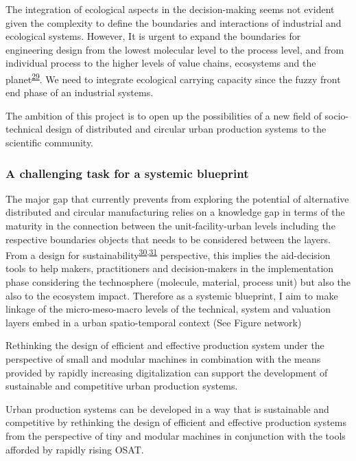 \documentclass[
  11pt,
  a4paperpaper,
  onecolumn]{article}
\begin{document}
The integration of ecological aspects in the decision-making seems not
evident given the complexity to define the boundaries and interactions
of industrial and ecological systems. However, It is urgent to expand
the boundaries for engineering design from the lowest molecular level to
the process level, and from individual process to the higher levels of
value chains, ecosystems and the
planet\textsuperscript{\protect\hyperlink{ref-Martinez-Hernandez2017}{29}}.
We need to integrate ecological carrying capacity since the fuzzy front
end phase of an industrial systems.

The ambition of this project is to open up the possibilities of a new
field of socio-technical design of distributed and circular urban
production systems to the scientific community.

\hypertarget{a-challenging-task-for-a-systemic-blueprint}{%
\subsubsection{A challenging task for a systemic
blueprint}\label{a-challenging-task-for-a-systemic-blueprint}}

The major gap that currently prevents from exploring the potential of
alternative distributed and circular manufacturing relies on a knowledge
gap in terms of the maturity in the connection between the
unit-facility-urban levels including the respective boundaries objects
that needs to be considered between the layers. From a design for
sustainability\textsuperscript{\protect\hyperlink{ref-Ceschin2016}{30},\protect\hyperlink{ref-SousaRocha2019}{31}}
perspective, this implies the aid-decision tools to help makers,
practitioners and decision-makers in the implementation phase
considering the technosphere (molecule, material, process unit) but also
the also to the ecosystem impact. Therefore as a systemic blueprint, I
aim to make linkage of the micro-meso-macro levels of the technical,
system and valuation layers embed in a urban spatio-temporal context
(See Figure network)

Rethinking the design of efficient and effective production system under
the perspective of small and modular machines in combination with the
means provided by rapidly increasing digitalization can support the
development of sustainable and competitive urban production systems.

Urban production systems can be developed in a way that is sustainable
and competitive by rethinking the design of efficient and effective
production systems from the perspective of tiny and modular machines in
conjunction with the tools afforded by rapidly rising OSAT.
\end{document}
